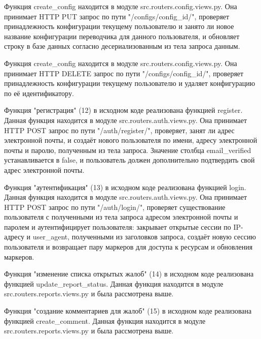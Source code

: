 Функция create\_config находится в модуле src.routers.config.views.py. Она принимает HTTP PUT запрос по пути "/configs/{config\_id}/", проверяет принадлежность конфигурации текущему пользователю и занято ли новое название конфигурации переводчика для данного пользователя, и обновляет строку в базе данных согласно десериализованным из тела запроса данным.

Функция create\_config находится в модуле src.routers.config.views.py. Она принимает HTTP DELETE запрос по пути "/configs/{config\_id}/", проверяет принадлежность конфигурации текущему пользователю и удаляет конфигурацию по её идентификатору.


Функция "регистрация" (12) в исходном коде реализована функцией register. Данная функция находится в модуле src.routers.auth.views.py. Она принимает HTTP POST запрос по пути "/auth/register/", проверяет, занят ли адрес электронной почты, и создаёт нового пользователя по имени, адресу электронной почты и паролю, полученным из тела запроса. Значение столбца email\_verified устанавливается в false, и пользователь должен дополнительно подтвердить свой адрес электронной почты.


Функция "аутентификация" (13) в исходном коде реализована функцией login. Данная функция находится в модуле src.routers.auth.views.py. Она принимает HTTP POST запрос по пути "/auth/login/", проверяет существование пользователя с полученными из тела запроса адресом электронной почты и паролем и аутентифицирует пользователя: закрывает открытые сессии по IP-адресу и user\_agent, полученными из заголовков запроса, создаёт новую сессию пользователя и возвращает пару маркеров для доступа к ресурсам и обновления маркеров.


Функция "изменение списка открытых жалоб" (14) в исходном коде реализована функцией update\_report\_status. Данная функция находится в модуле src.routers.reports.views.py и была рассмотрена выше.


Функция "создание комментариев для жалоб" (15) в исходном коде реализована функцией create\_comment. Данная функция находится в модуле src.routers.reports.views.py и была рассмотрена выше.

